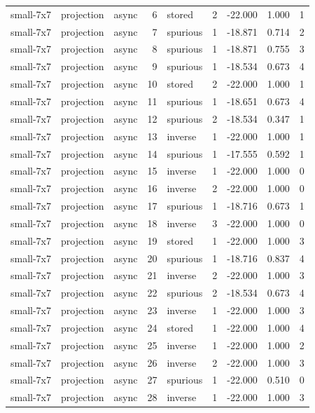 \begin{tabular}{lllrlrrrr}
small-7x7 & projection & async & 6 & stored & 2 & -22.000 & 1.000 & 1 \\
small-7x7 & projection & async & 7 & spurious & 1 & -18.871 & 0.714 & 2 \\
small-7x7 & projection & async & 8 & spurious & 1 & -18.871 & 0.755 & 3 \\
small-7x7 & projection & async & 9 & spurious & 1 & -18.534 & 0.673 & 4 \\
small-7x7 & projection & async & 10 & stored & 2 & -22.000 & 1.000 & 1 \\
small-7x7 & projection & async & 11 & spurious & 1 & -18.651 & 0.673 & 4 \\
small-7x7 & projection & async & 12 & spurious & 2 & -18.534 & 0.347 & 1 \\
small-7x7 & projection & async & 13 & inverse & 1 & -22.000 & 1.000 & 1 \\
small-7x7 & projection & async & 14 & spurious & 1 & -17.555 & 0.592 & 1 \\
small-7x7 & projection & async & 15 & inverse & 1 & -22.000 & 1.000 & 0 \\
small-7x7 & projection & async & 16 & inverse & 2 & -22.000 & 1.000 & 0 \\
small-7x7 & projection & async & 17 & spurious & 1 & -18.716 & 0.673 & 1 \\
small-7x7 & projection & async & 18 & inverse & 3 & -22.000 & 1.000 & 0 \\
small-7x7 & projection & async & 19 & stored & 1 & -22.000 & 1.000 & 3 \\
small-7x7 & projection & async & 20 & spurious & 1 & -18.716 & 0.837 & 4 \\
small-7x7 & projection & async & 21 & inverse & 2 & -22.000 & 1.000 & 3 \\
small-7x7 & projection & async & 22 & spurious & 2 & -18.534 & 0.673 & 4 \\
small-7x7 & projection & async & 23 & inverse & 1 & -22.000 & 1.000 & 3 \\
small-7x7 & projection & async & 24 & stored & 1 & -22.000 & 1.000 & 4 \\
small-7x7 & projection & async & 25 & inverse & 1 & -22.000 & 1.000 & 2 \\
small-7x7 & projection & async & 26 & inverse & 2 & -22.000 & 1.000 & 3 \\
small-7x7 & projection & async & 27 & spurious & 1 & -22.000 & 0.510 & 0 \\
small-7x7 & projection & async & 28 & inverse & 1 & -22.000 & 1.000 & 3 \\

\end{tabular}
